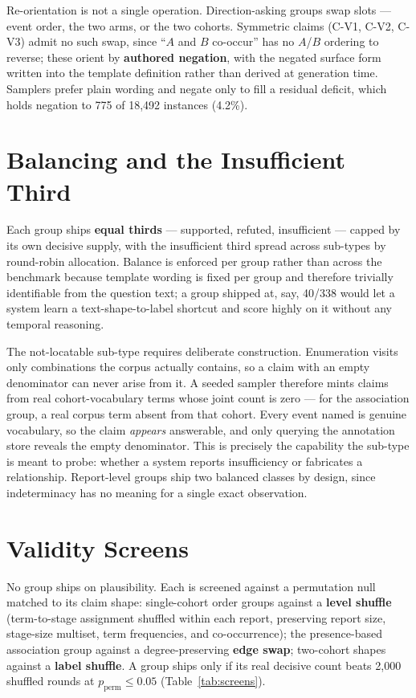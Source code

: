 Re-orientation is not a single operation. Direction-asking groups swap slots ---
event order, the two arms, or the two cohorts. Symmetric claims (C-V1, C-V2,
C-V3) admit no such swap, since ``$A$ and $B$ co-occur'' has no $A$/$B$ ordering
to reverse; these orient by \textbf{authored negation}, with the negated surface
form written into the template definition rather than derived at generation time.
Samplers prefer plain wording and negate only to fill a residual deficit, which
holds negation to 775 of 18{,}492 instances (4.2\%).

\section{Balancing and the Insufficient Third}
\label{sec:balance}

Each group ships \textbf{equal thirds} --- supported, refuted, insufficient ---
capped by its own decisive supply, with the insufficient third spread across
sub-types by round-robin allocation. Balance is enforced per group rather than
across the benchmark because template wording is fixed per group and therefore
trivially identifiable from the question text; a group shipped at, say, 40/338
would let a system learn a text-shape-to-label shortcut and score highly on it
without any temporal reasoning.

The not-locatable sub-type requires deliberate construction. Enumeration visits
only combinations the corpus actually contains, so a claim with an empty
denominator can never arise from it. A seeded sampler therefore mints claims from
real cohort-vocabulary terms whose joint count is zero --- for the association
group, a real corpus term absent from that cohort. Every event named is genuine
vocabulary, so the claim \emph{appears} answerable, and only querying the
annotation store reveals the empty denominator. This is precisely the capability
the sub-type is meant to probe: whether a system reports insufficiency or
fabricates a relationship. Report-level groups ship two balanced classes by
design, since indeterminacy has no meaning for a single exact observation.

\section{Validity Screens}
\label{sec:screens}

No group ships on plausibility. Each is screened against a permutation null
matched to its claim shape: single-cohort order groups against a
\textbf{level shuffle} (term-to-stage assignment shuffled within each report,
preserving report size, stage-size multiset, term frequencies, and
co-occurrence); the presence-based association group against a degree-preserving
\textbf{edge swap}; two-cohort shapes against a \textbf{label shuffle}. A group
ships only if its real decisive count beats 2{,}000 shuffled rounds at
$p_{\textrm{perm}} \leq 0.05$ (Table~\ref{tab:screens}).

